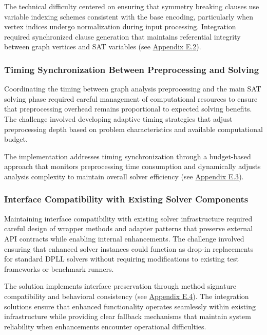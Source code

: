 The technical difficulty centered on ensuring that symmetry breaking clauses use variable indexing schemes consistent with the base encoding, particularly when vertex indices undergo normalization during input processing. Integration required synchronized clause generation that maintains referential integrity between graph vertices and SAT variables (see \hyperref[appendix:symmetry-integration]{Appendix E.2}).

\subsubsection{Timing Synchronization Between Preprocessing and Solving}

Coordinating the timing between graph analysis preprocessing and the main SAT solving phase required careful management of computational resources to ensure that preprocessing overhead remains proportional to expected solving benefits. The challenge involved developing adaptive timing strategies that adjust preprocessing depth based on problem characteristics and available computational budget.

The implementation addresses timing synchronization through a budget-based approach that monitors preprocessing time consumption and dynamically adjusts analysis complexity to maintain overall solver efficiency (see \hyperref[appendix:timing-coordination]{Appendix E.3}).

\subsubsection{Interface Compatibility with Existing Solver Components}

Maintaining interface compatibility with existing solver infrastructure required careful design of wrapper methods and adapter patterns that preserve external API contracts while enabling internal enhancements. The challenge involved ensuring that enhanced solver instances could function as drop-in replacements for standard DPLL solvers without requiring modifications to existing test frameworks or benchmark runners.

The solution implements interface preservation through method signature compatibility and behavioral consistency (see \hyperref[appendix:interface-compatibility]{Appendix E.4}). The integration solutions ensure that enhanced functionality operates seamlessly within existing infrastructure while providing clear fallback mechanisms that maintain system reliability when enhancements encounter operational difficulties.

